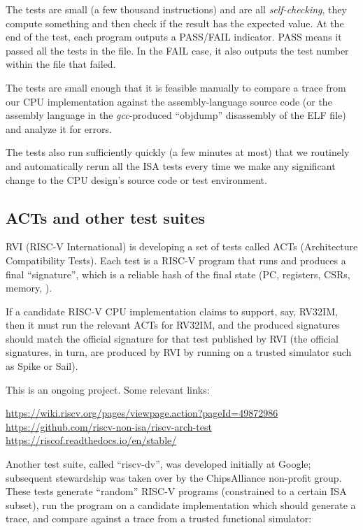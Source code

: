 The tests are small (a few thousand instructions) and are all
\emph{self-checking}, {\ie} they compute something and then check if
the result has the expected value.  At the end of the test, each
program outputs a PASS/FAIL indicator.  PASS means it passed all the
tests in the file. In the FAIL case, it also outputs the test number
within the file that failed.

The tests are small enough that it is feasible manually to compare a
trace from our CPU implementation against the assembly-language source
code (or the assembly language in the \emph{gcc}-produced ``objdump''
disassembly of the ELF file) and analyze it for errors.

The tests also run sufficiently quickly (a few minutes at most) that
we routinely and automatically rerun all the ISA tests every time we
make any significant change to the CPU design's source code or test
environment.


\subsection{ACTs and other test suites}

RVI (RISC-V International) is developing a set of tests called ACTs
(Architecture Compatibility Tests).  Each test is a RISC-V program
that runs and produces a final ``signature'', which is a reliable hash
of the final state (PC, registers, CSRs, memory, {\etc}).

If a candidate RISC-V CPU implementation claims to support, say,
RV32IM, then it must run the relevant ACTs for RV32IM, and the
produced signatures should match the official signature for that test
published by RVI (the official signatures, in turn, are produced by
RVI by running on a trusted simulator such as Spike or Sail).

This is an ongoing project. Some relevant links:

\begin{tabbing}
\hmm \= \url{https://wiki.riscv.org/pages/viewpage.action?pageId=49872986} \\
     \> \url{https://github.com/riscv-non-isa/riscv-arch-test} \\
     \> \url{https://riscof.readthedocs.io/en/stable/}
\end{tabbing}

Another test suite, called ``riscv-dv'', was developed initially at
Google; subsequent stewardship was taken over by the ChipsAlliance
non-profit group.  These tests generate ``random'' RISC-V programs
(constrained to a certain ISA subset), run the program on a candidate
implementation which should generate a trace, and compare against a
trace from a trusted functional simulator:

